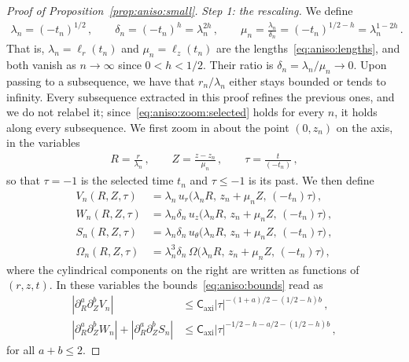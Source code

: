 \documentclass[11pt,reqno]{amsproc}
\numberwithin{equation}{section}
\theoremstyle{remark}
\newcommand{\p}{\partial}
\newcommand{\Caxi}{\mathsf{C}_{\mathrm{axi}}}
\begin{document}
\begin{proof}[Proof of Proposition~\ref{prop:aniso:small}]
\emph{Step 1: the rescaling.}
We define
\begin{align}
\lambda_n=(-t_n)^{1/2}
\,,\qquad
\delta_n=(-t_n)^h = \lambda_n^{2h}
\,,\qquad
\mu_n=\frac{\lambda_n}{\delta_n}=(-t_n)^{1/2-h}
=\lambda_n^{1-2h}
\,.
\label{eq:aniso:zoom:lengths}
\end{align}
That is, $\lambda_n=\ell_r(t_n)$ and $\mu_n=\ell_z(t_n)$ are the lengths~\eqref{eq:aniso:lengths}, and both vanish as $n\to\infty$ since $0<h<1/2$. Their ratio is $\delta_n=\lambda_n/\mu_n\to0$. Upon passing to a subsequence, we have that $r_n/\lambda_n$ either stays bounded or tends to infinity. Every subsequence extracted in this proof refines the previous ones, and we do not relabel it; since~\eqref{eq:aniso:zoom:selected} holds for every $n$, it holds along every subsequence. We first zoom in about the point $(0,z_n)$ on the axis, in the variables
\begin{align}
R=\frac{r}{\lambda_n}
\,,\qquad
Z = \frac{z-z_n}{\mu_n}
\,,\qquad
\tau = \frac{t}{(-t_n)}
\,,
\label{eq:aniso:zoom:finite:variables}
\end{align}
so that $\tau=-1$ is the selected time $t_n$ and $\tau\le-1$ is its past. We then define
\begin{subequations}
\label{eq:aniso:zoom:fields}
\begin{align}
V_n(R,Z,\tau)&=\lambda_n\,u_r\bigl(\lambda_nR,\,z_n+\mu_nZ,\,(-t_n)\tau\bigr)
\,, \\
W_n(R,Z,\tau)&=\lambda_n\delta_n\,u_z\bigl(\lambda_nR,\,z_n+\mu_nZ,\,(-t_n)\tau\bigr)
\,, \\
S_n(R,Z,\tau)&=\lambda_n\delta_n\,u_\theta\bigl(\lambda_nR,\,z_n+\mu_nZ,\,(-t_n)\tau\bigr)
\label{eq:aniso:zoom:fields:c}
\,, \\
\Omega_n(R,Z,\tau)&=\lambda_n^3\delta_n\,\Omega\bigl(\lambda_nR,\,z_n+\mu_nZ,\,(-t_n)\tau\bigr)
\,,
\end{align}
\end{subequations}
where the cylindrical components on the right are written as functions of $(r,z,t)$. In these variables the bounds~\eqref{eq:aniso:bounds} read as
\begin{subequations}
\label{eq:aniso:zoom:derivatives}
\begin{align}
|\p_R^a\p_Z^bV_n|
&\le \Caxi|\tau|^{-(1+a)/2-(1/2-h)b}
\,,\\
|\p_R^a\p_Z^bW_n|+|\p_R^a\p_Z^bS_n|
&\le \Caxi|\tau|^{-1/2-h-a/2-(1/2-h)b}
\,,
\end{align}
\end{subequations}
for all $a+b\le2$.


\end{proof}
\end{document}
